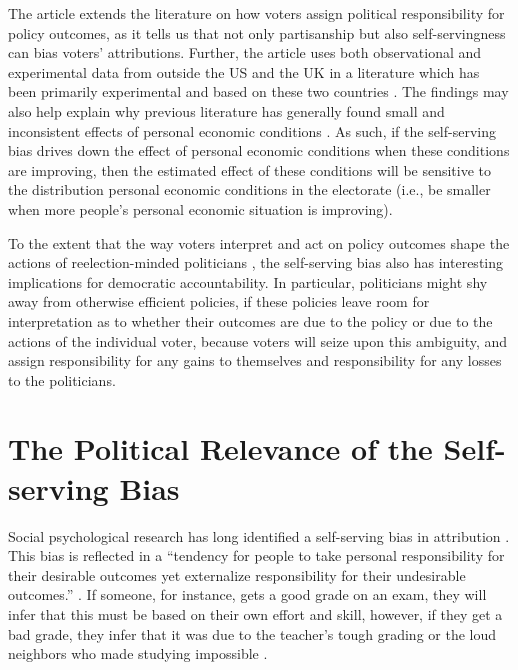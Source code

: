 \documentclass[a4paper,11pt]{article}
\begin{document}
	The article extends the literature on how voters assign political responsibility for policy outcomes, as it tells us that not only partisanship but also self-servingness can bias voters' attributions. Further, the article uses both observational and experimental data from outside the US and the UK in a literature which has been primarily experimental and based on these two countries \citep{rudolph2006triangulating,malhotra2007effect,healy2014partisaen,marsh2010attribution,tilley2011government}. The findings may also help explain why previous literature has generally found small and inconsistent effects of personal economic conditions \citep{kinder1979economic,kinder1981sociotropic,singer2013context,lewis2013vp,stubager2014scope}. As such, if the self-serving bias drives down the effect of personal economic conditions when these conditions are improving, then the estimated effect of these conditions will be sensitive to the distribution personal economic conditions in the electorate (i.e., be smaller when more people's personal economic situation is improving). 
	
	To the extent that the way voters interpret and act on policy outcomes shape the actions of reelection-minded politicians \citep{ferejohn1986incumbent,besley2007principled,alt2011disentangling,tilley2017pound}, the self-serving bias also has interesting implications for democratic accountability. In particular, politicians might shy away from otherwise efficient policies, if these policies leave room for interpretation as to whether their outcomes are due to the policy or due to the actions of the individual voter, because voters will seize upon this ambiguity, and assign responsibility for any gains to themselves and responsibility for any losses to the politicians.
	
	
	
	\section{The Political Relevance of the Self-serving Bias}
	Social psychological research has long identified a self-serving bias in attribution \citep[272]{heider2013psychology,greenwald1980totalitarian,stephan1976egotism,fiske2013social}. This bias is reflected in a ``tendency for people to take personal responsibility for their desirable outcomes yet externalize responsibility for their undesirable outcomes.'' \cite[895]{shepperd2008exploring}. If someone, for instance, gets a good grade on an exam, they will infer that this must be based on their own effort and skill, however, if they get a bad grade, they infer that it was due to the teacher's tough grading or the loud neighbors who made studying impossible \citep{mcallister1996self}.
	
\end{document}
